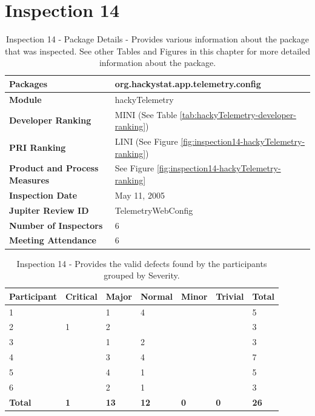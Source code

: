 \clearpage
\section{Inspection 14}
\label{appendix:section:inspection14}

\begin{table}[!h]
  \begin{center}
    \caption[Inspection 14 - Package Details]{Inspection 14 - Package Details 
      - Provides various information about the package that was
      inspected. See other Tables and Figures in this chapter for more
      detailed information about the package.}
    \label{tab:inspection-package-details-14}
    \begin{tabular}{|p{5.0cm}|p{8.0cm}|} \hline
{\bf Packages} & org.hackystat.app.telemetry.config \\ \hline
{\bf Module} & hackyTelemetry \\ \hline
{\bf Developer Ranking} & MINI (See Table \ref{tab:hackyTelemetry-developer-ranking}) \\ \hline
{\bf PRI Ranking} & LINI (See Figure \ref{fig:inspection14-hackyTelemetry-ranking}) \\ \hline
{\bf Product and Process Measures} & See Figure \ref{fig:inspection14-hackyTelemetry-ranking} \\ \hline
{\bf Inspection Date} & May 11, 2005 \\ \hline
{\bf Jupiter Review ID} & TelemetryWebConfig \\ \hline
{\bf Number of Inspectors} & 6 \\ \hline
{\bf Meeting Attendance} & 6 \\ \hline
    \end{tabular}
  \end{center}
\end{table}

\begin{table}[!h]
  \begin{center}
    \caption[Inspection 14 - Results by Severity]{Inspection 14
      - Provides the valid defects found by the participants grouped by
      Severity.}
    \label{tab:inspection-results-14}
    \begin{tabular}{|p{2.0cm}|p{1.5cm}|p{1.5cm}|p{1.5cm}|p{1.5cm}|p{1.5cm}|p{1.5cm}|} \hline
{\bf Participant} & {\bf Critical} & {\bf Major} 
& {\bf Normal} & {\bf Minor} & {\bf Trivial} & {\bf Total} \\ \hline
1 &   & 1 & 4 &   &   & 5 \\ \hline
2 & 1 & 2 &   &   &   & 3 \\ \hline
3 &   & 1 & 2 &   &   & 3 \\ \hline
4 &   & 3 & 4 &   &   & 7 \\ \hline
5 &   & 4 & 1 &   &   & 5 \\ \hline
6 &   & 2 & 1 &   &   & 3 \\ \hline
{\bf Total} & {\bf 1} & {\bf 13} & {\bf 12} & {\bf 0} & {\bf 0} & {\bf 26} \\ \hline
    \end{tabular}
  \end{center}
\end{table}

